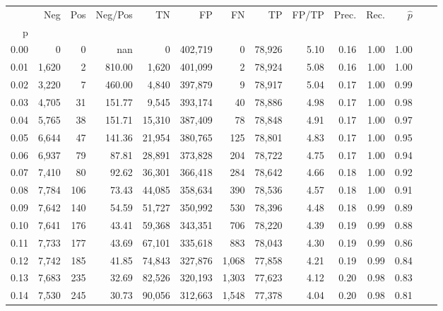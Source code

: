 \begin{tabular}{rrrrrrrrrrrrrr}
\toprule
{} &    Neg &    Pos & Neg/Pos &       TN &       FP &      FN &      TP & FP/TP & Prec. &  Rec. & $\hat{p}$ \\
p    &        &        &         &          &          &         &         &       &       &       &           \\
\midrule
0.00 &      0 &      0 &     nan &        0 &  402,719 &       0 &  78,926 &  5.10 &  0.16 &  1.00 &      1.00 \\
0.01 &  1,620 &      2 &  810.00 &    1,620 &  401,099 &       2 &  78,924 &  5.08 &  0.16 &  1.00 &      1.00 \\
0.02 &  3,220 &      7 &  460.00 &    4,840 &  397,879 &       9 &  78,917 &  5.04 &  0.17 &  1.00 &      0.99 \\
0.03 &  4,705 &     31 &  151.77 &    9,545 &  393,174 &      40 &  78,886 &  4.98 &  0.17 &  1.00 &      0.98 \\
0.04 &  5,765 &     38 &  151.71 &   15,310 &  387,409 &      78 &  78,848 &  4.91 &  0.17 &  1.00 &      0.97 \\
0.05 &  6,644 &     47 &  141.36 &   21,954 &  380,765 &     125 &  78,801 &  4.83 &  0.17 &  1.00 &      0.95 \\
0.06 &  6,937 &     79 &   87.81 &   28,891 &  373,828 &     204 &  78,722 &  4.75 &  0.17 &  1.00 &      0.94 \\
0.07 &  7,410 &     80 &   92.62 &   36,301 &  366,418 &     284 &  78,642 &  4.66 &  0.18 &  1.00 &      0.92 \\
0.08 &  7,784 &    106 &   73.43 &   44,085 &  358,634 &     390 &  78,536 &  4.57 &  0.18 &  1.00 &      0.91 \\
0.09 &  7,642 &    140 &   54.59 &   51,727 &  350,992 &     530 &  78,396 &  4.48 &  0.18 &  0.99 &      0.89 \\
0.10 &  7,641 &    176 &   43.41 &   59,368 &  343,351 &     706 &  78,220 &  4.39 &  0.19 &  0.99 &      0.88 \\
0.11 &  7,733 &    177 &   43.69 &   67,101 &  335,618 &     883 &  78,043 &  4.30 &  0.19 &  0.99 &      0.86 \\
0.12 &  7,742 &    185 &   41.85 &   74,843 &  327,876 &   1,068 &  77,858 &  4.21 &  0.19 &  0.99 &      0.84 \\
0.13 &  7,683 &    235 &   32.69 &   82,526 &  320,193 &   1,303 &  77,623 &  4.12 &  0.20 &  0.98 &      0.83 \\
0.14 &  7,530 &    245 &   30.73 &   90,056 &  312,663 &   1,548 &  77,378 &  4.04 &  0.20 &  0.98 &      0.81 \\

\end{tabular}
